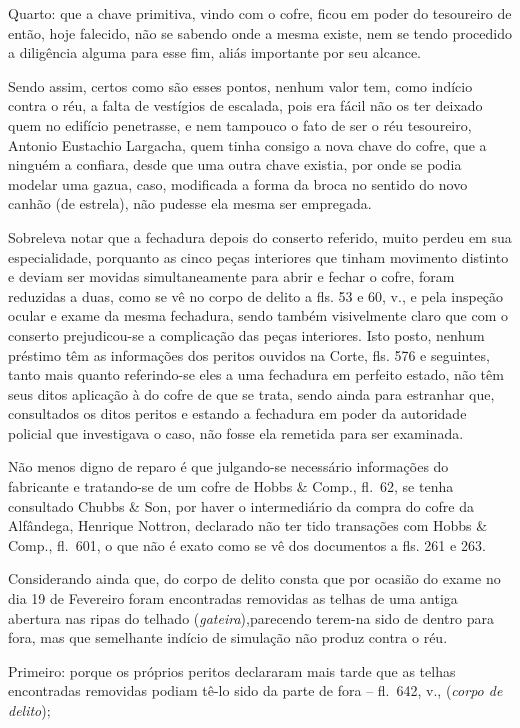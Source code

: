 Quarto: que a chave primitiva, vindo com o cofre, ficou em poder do
tesoureiro de então, hoje falecido, não se sabendo onde a mesma existe,
nem se tendo procedido a diligência alguma para esse fim, aliás
importante por seu alcance.

Sendo assim, certos como são esses pontos, nenhum valor tem, como
indício contra o réu, a falta de vestígios de escalada, pois era fácil
não os ter deixado quem no edifício penetrasse, e nem tampouco o fato de
ser o réu tesoureiro, Antonio Eustachio Largacha, quem tinha consigo a
nova chave do cofre, que a ninguém a confiara, desde que uma outra chave
existia, por onde se podia modelar uma gazua, caso, modificada a forma
da broca no sentido do novo canhão (de estrela), não pudesse ela mesma
ser empregada.

Sobreleva notar que a fechadura depois do conserto referido, muito
perdeu em sua especialidade, porquanto as cinco peças interiores que
tinham movimento distinto e deviam ser movidas simultaneamente para
abrir e fechar o cofre, foram reduzidas a duas, como se vê no corpo de
delito a fls. 53 e 60, v., e pela inspeção ocular e exame da mesma
fechadura, sendo também visivelmente claro que com o conserto
prejudicou-se a complicação das peças interiores. Isto posto, nenhum
préstimo têm as informações dos peritos ouvidos na Corte, fls. 576 e
seguintes, tanto mais quanto referindo-se eles a uma fechadura em
perfeito estado, não têm seus ditos aplicação à do cofre de que se
trata, sendo ainda para estranhar que, consultados os ditos peritos e
estando a fechadura em poder da autoridade policial que investigava o
caso, não fosse ela remetida para ser examinada.

Não menos digno de reparo é que julgando-se necessário informações do
fabricante e tratando-se de um cofre de Hobbs \& Comp., fl.~62, se tenha
consultado Chubbs \& Son, por haver o intermediário da compra do cofre
da Alfândega, Henrique Nottron, declarado não ter tido transações com
Hobbs \& Comp., fl.~601, o que não é exato como se vê dos documentos a
fls. 261 e 263.

Considerando ainda que, do corpo de delito consta que por ocasião do
exame no dia 19 de Fevereiro foram encontradas removidas as telhas de
uma antiga abertura nas ripas do telhado (\emph{gateira}),parecendo
terem-na sido de dentro para fora, mas que semelhante indício de
simulação não produz contra o réu.

Primeiro: porque os próprios peritos declararam mais tarde que as telhas
encontradas removidas podiam tê-lo sido da parte de fora -- fl.~642, v.,
(\emph{corpo de delito});

